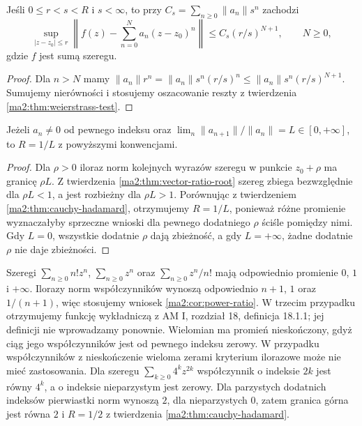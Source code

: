 \begin{wniosek}
\label{ma2:cor:power-remainder}
Jeśli $0\le r<s<R$ i $s<\infty$, to przy
$C_s=\sum_{n\ge0}\|a_n\|s^n$ zachodzi
\[
 \sup_{|z-z_0|\le r}
 \left\|f(z)-\sum_{n=0}^Na_n(z-z_0)^n\right\|
 \le C_s(r/s)^{N+1},\qquad N\ge0,
\]
gdzie $f$ jest sumą szeregu.
\end{wniosek}
\begin{proof}
Dla $n>N$ mamy
$\|a_n\|r^n=\|a_n\|s^n(r/s)^n
\le\|a_n\|s^n(r/s)^{N+1}$.
Sumujemy nierówności i stosujemy oszacowanie
reszty z twierdzenia \ref{ma2:thm:weierstrass-test}.
\end{proof}

\begin{wniosek}
\label{ma2:cor:power-ratio}
Jeżeli $a_n\ne0$ od pewnego indeksu oraz
$\lim_n\|a_{n+1}\|/\|a_n\|=L\in[0,+\infty]$,
to $R=1/L$ z powyższymi konwencjami.
\end{wniosek}
\begin{proof}
Dla $\rho>0$ iloraz norm kolejnych wyrazów
szeregu w punkcie $z_0+\rho$ ma granicę $\rho L$.
Z twierdzenia \ref{ma2:thm:vector-ratio-root}
szereg zbiega bezwzględnie dla $\rho L<1$,
a jest rozbieżny dla $\rho L>1$.
Porównując z twierdzeniem
\ref{ma2:thm:cauchy-hadamard}, otrzymujemy
$R=1/L$, ponieważ różne promienie wyznaczałyby
sprzeczne wnioski dla pewnego dodatniego $\rho$
ściśle pomiędzy nimi. Gdy $L=0$, wszystkie
dodatnie $\rho$ dają zbieżność, a gdy $L=+\infty$,
żadne dodatnie $\rho$ nie daje zbieżności.
\end{proof}

\begin{przyklad}
\label{ma2:ex:power-radii}
Szeregi $\sum_{n\ge0}n!z^n$, $\sum_{n\ge0}z^n$
oraz $\sum_{n\ge0}z^n/n!$ mają odpowiednio
promienie $0$, $1$ i $+\infty$. Ilorazy norm
współczynników wynoszą odpowiednio $n+1$,
$1$ oraz $1/(n+1)$, więc stosujemy wniosek
\ref{ma2:cor:power-ratio}.
W trzecim przypadku otrzymujemy funkcję
wykładniczą z AM I, rozdział 18, definicja
18.1.1; jej definicji nie wprowadzamy ponownie.
Wielomian ma promień nieskończony, gdyż
ciąg jego współczynników jest od pewnego
indeksu zerowy.
W przypadku współczynników z nieskończenie
wieloma zerami kryterium ilorazowe może nie
mieć zastosowania. Dla szeregu
$\sum_{k\ge0}4^kz^{2k}$ współczynnik o indeksie
$2k$ jest równy $4^k$, a o indeksie nieparzystym
jest zerowy. Dla parzystych dodatnich indeksów
pierwiastki norm wynoszą $2$, dla nieparzystych
$0$, zatem granica górna jest równa $2$ i
$R=1/2$ z twierdzenia \ref{ma2:thm:cauchy-hadamard}.
\end{przyklad}

